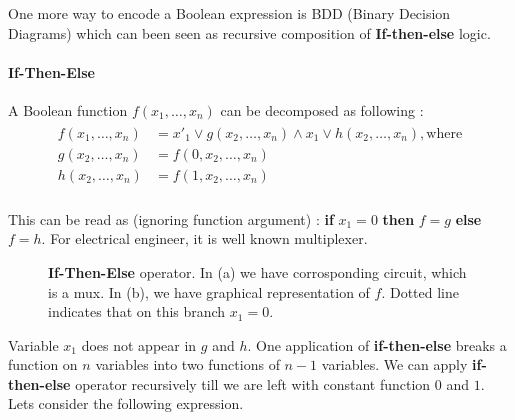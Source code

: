   One more way to encode a Boolean expression is BDD (Binary Decision
  Diagrams) which can been seen as recursive composition of
\textbf{If-then-else} logic.

  \paragraph{If-Then-Else}
  A Boolean function $f(x_1,\ldots,x_n)$ can be decomposed as following :
  \begin{equation}
    \begin{gathered}
      \begin{aligned}
        f(x_1,\ldots,x_n) &= {x'_1} \vee g(x_2,\ldots,x_n) \wedge {x_1} \vee
        h(x_2,\ldots,x_n), \text{where} \\
        g(x_2,\ldots,x_n) &= f(0,x_2,\ldots,x_n) \\
        h(x_2,\ldots,x_n) &= f(1,x_2, \ldots, x_n) \\
      \end{aligned}
    \end{gathered}
  \end{equation}

  This can be read as (ignoring function argument) : \textbf{if} $x_1=0$
  \textbf{then} $f = g$ \textbf{else} $f=h$. For electrical engineer, it is well
  known multiplexer. 


  \begin{figure}[h]
    \centering
  \caption{\textbf{If-Then-Else} operator. In (a) we have corrosponding
  circuit, which is a mux. In (b), we have graphical representation of
  $f$. Dotted line indicates that on this branch $x_1=0$.}
  \end{figure}

  Variable $x_1$ does not appear in $g$ and $h$. One application of
\textbf{if-then-else} breaks a function on $n$ variables into two functions of
$n-1$ variables. We can apply \textbf{if-then-else} operator recursively till
we are left with constant function $0$ and $1$. Lets consider the following
expression.

